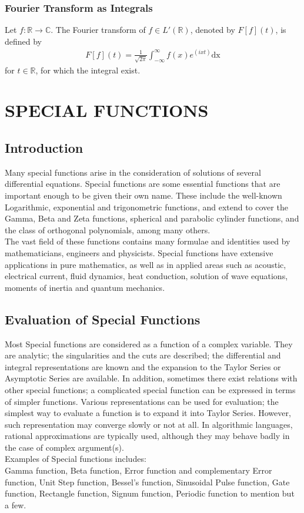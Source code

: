 \documentclass[11pt]{report}
\newcommand{\sps}{\\[0.2cm]}
\newcommand{\dsp}{\displaystyle}
\newcommand{\real}{ \mathbb{R}}
\newcommand{\complex}{\mathbb{C}}
\begin{document}
	\subsection{Fourier Transform as Integrals}
		\label{sec:1_7_5}
	Let $\dsp f:\real\rightarrow\complex$. The Fourier transform of $f\in L'(\real)$, denoted by $\dsp F[f](t)$, is defined by
	\begin{eqnarray}
		F[f](t) = \frac{1}{\sqrt{2\pi}}\int_{-\infty}^\infty f(x)e^{(ixt)}\text{dx}\label{eq:1_7}
	\end{eqnarray}
	for $t\in\real$, for which the integral exist.

	
	\chapter{SPECIAL FUNCTIONS}
	\section{Introduction}
	Many special functions arise in the consideration of solutions of several differential equations. Special functions are some essential functions that are important enough to be given their own name. These include the well-known Logarithmic, exponential and trigonometric functions, and extend to cover the Gamma, Beta and Zeta functions, spherical and parabolic cylinder functions, and the class of orthogonal polynomials, among many others.\\
	
	The vast field of these functions contains many formulae and identities used by mathematicians, engineers and physicists. Special functions have extensive applications in pure mathematics, as well as in applied areas such as acoustic, electrical current, fluid dynamics, heat conduction, solution of wave equations, moments of inertia and quantum mechanics.
	
	\section{Evaluation of Special Functions}
	Most Special functions are considered as a function of a complex variable. They are analytic; the singularities and the cuts are described; the differential and integral representations are known and the expansion to the Taylor Series or Asymptotic Series are available. In addition, sometimes there exist relations with other special functions; a complicated special function can be expressed in terms of simpler functions. Various representations can be used for evaluation; the simplest way to evaluate a function is to expand it into Taylor Series. However, such representation may converge slowly or not at all. In algorithmic languages, rational approximations are typically used, although they may behave badly in the case of complex argument(s).\sps
	Examples of Special functions includes:\\
	Gamma function, Beta function, Error function and complementary Error function, Unit Step function, Bessel's function, Sinusoidal Pulse function, Gate function, Rectangle function, Signum function, Periodic function to mention but a few.
	
\end{document}
